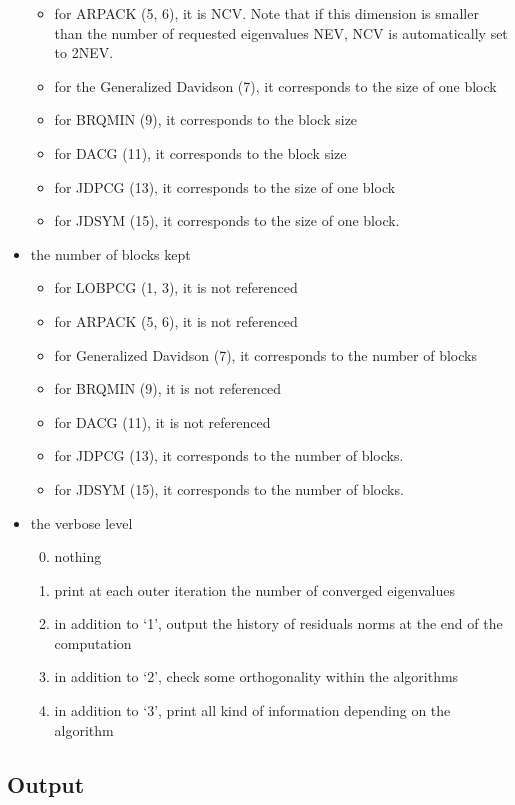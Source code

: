 \documentclass[11pt]{article}
\begin{document}
\begin{itemize}
\begin{itemize}
	\item for ARPACK (5, 6), it is NCV. Note that if this dimension is smaller than
	the number of requested eigenvalues NEV, NCV is automatically set to 2NEV. 
	\item for the Generalized Davidson (7), it corresponds to the size of one block
	\item for BRQMIN (9), it corresponds to the block size
	\item for DACG (11), it corresponds to the block size
	\item for JDPCG (13), it corresponds to the size of one block
	\item for JDSYM (15), it corresponds to the size of one block.
	\end{itemize}
\item the number of blocks kept
         \begin{itemize}
           \item for LOBPCG (1, 3), it is not referenced
           \item for ARPACK (5, 6), it is not referenced
           \item for Generalized Davidson (7), it corresponds to the number of blocks
           \item for BRQMIN (9), it is not referenced
           \item for DACG (11), it is not referenced
           \item for JDPCG (13), it corresponds to the number of blocks.
           \item for JDSYM (15), it corresponds to the number of blocks.
         \end{itemize}
\item the verbose level
	\begin{enumerate}
	\setcounter{enumi}{-1}
	\item nothing
	\item print at each outer iteration the number of converged eigenvalues
	\item in addition to `1', output the history of residuals norms at the end of	the computation
	\item in addition to `2', check some orthogonality within the algorithms
	\item in addition to `3', print all kind of information depending on the
	algorithm 
	\end{enumerate}
\end{itemize}

\subsection{Output}
\end{document}
